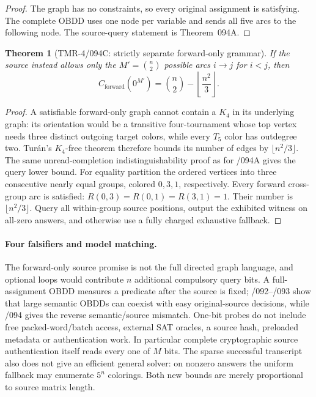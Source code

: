 \documentclass[11pt]{article}
\newtheorem{theorem}{Theorem}
\begin{document}
\begin{proof}
The graph has no constraints, so every original assignment is
satisfying. The complete OBDD uses one node per variable and sends
all five arcs to the following node. The source-query statement is
Theorem~094A.
\end{proof}
\begin{theorem}[TMR-4/094C: strictly separate forward-only grammar]
If the source instead allows only the $M'=\binom n2$ possible arcs
$i\to j$ for $i<j$, then
\[
\boxed{C_{\mathrm{forward}}(0^{M'})=
\binom n2-\left\lfloor\frac{n^2}{3}\right\rfloor.}
\]
\end{theorem}
\begin{proof}
A satisfiable forward-only graph cannot contain a $K_4$ in its
underlying graph: its orientation would be a transitive four-tournament
whose top vertex needs three distinct outgoing target colors, while
every $T_5$ color has outdegree two. Tur\'an's $K_4$-free theorem
therefore bounds its number of edges by $\lfloor n^2/3\rfloor$.
The same unread-completion indistinguishability proof as for /094A
gives the query lower bound. For equality partition the ordered
vertices into three consecutive nearly equal groups, colored
$0,3,1$, respectively. Every forward cross-group arc is satisfied:
$R(0,3)=R(0,1)=R(3,1)=1$. Their number is
$\lfloor n^2/3\rfloor$. Query all within-group source positions,
output the exhibited witness on all-zero answers, and otherwise use a
fully charged exhaustive fallback.
\end{proof}
\paragraph{Four falsifiers and model matching.}
The forward-only source promise is not the full directed graph
language, and optional loops would contribute $n$ additional
compulsory query bits. A full-assignment OBDD measures a predicate
after the source is fixed; /092--/093 show that large semantic OBDDs
can coexist with easy original-source decisions, while /094 gives the
reverse semantic/source mismatch. One-bit probes do not include
free packed-word/batch access, external SAT oracles, a source hash,
preloaded metadata or authentication work. In particular complete
cryptographic source authentication itself reads every one of $M$
bits. The sparse successful transcript also does not give an efficient
general solver: on nonzero answers the uniform fallback may enumerate
$5^n$ colorings. Both new bounds are merely proportional to source
matrix length.
\end{document}

